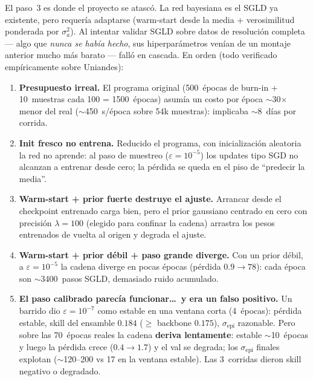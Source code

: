 \documentclass[12pt,a4paper]{article}
\begin{document}
El paso~3 es donde el proyecto se atascó. La red bayesiana es el SGLD ya
existente, pero requería adaptarse (warm-start desde la media +
verosimilitud ponderada por $\sigma_a^2$). Al intentar validar SGLD sobre
datos de resolución completa --- algo que \emph{nunca se había hecho}, sus
hiperparámetros venían de un montaje anterior mucho más barato --- falló en
cascada. En orden (todo verificado empíricamente sobre Uniandes):

\begin{enumerate}[leftmargin=1.6em, noitemsep]
  \item \textbf{Presupuesto irreal.} El programa original (500~épocas de
        burn-in + 10~muestras cada 100 = 1500~épocas) asumía un costo por
        época $\sim$30$\times$ menor del real ($\sim$450~s/época sobre 54k
        muestras): implicaba $\sim$8~días por corrida.
  \item \textbf{Init fresco no entrena.} Reducido el programa, con
        inicialización aleatoria la red no aprende: al paso de muestreo
        ($\varepsilon = 10^{-5}$) los updates tipo SGD no alcanzan a entrenar
        desde cero; la pérdida se queda en el piso de ``predecir la media''.
  \item \textbf{Warm-start + prior fuerte destruye el ajuste.} Arrancar desde
        el checkpoint entrenado carga bien, pero el prior gaussiano centrado
        en cero con precisión $\lambda=100$ (elegido para confinar la cadena)
        arrastra los pesos entrenados de vuelta al origen y degrada el
        ajuste.
  \item \textbf{Warm-start + prior débil + paso grande diverge.} Con un prior
        débil, a $\varepsilon = 10^{-5}$ la cadena diverge en pocas épocas
        (pérdida $0.9\to78$): cada época son $\sim$3400~pasos SGLD, demasiado
        ruido acumulado.
  \item \textbf{El paso calibrado parecía funcionar\ldots\ y era un falso
        positivo.} Un barrido dio $\varepsilon = 10^{-7}$ como estable en una
        ventana corta (4~épocas): pérdida estable, skill del ensamble
        $0.184$ ($\geq$ backbone $0.175$), $\sigma_\text{epi}$ razonable.
        Pero sobre las 70~épocas reales la cadena \textbf{deriva lentamente}:
        estable $\sim$10~épocas y luego la pérdida crece ($0.4\to1.7$) y el
        val se degrada; los $\sigma_\text{epi}$ finales explotan
        ($\sim$120--200 vs 17 en la ventana estable). Las 3~corridas dieron
        skill negativo o degradado.
\end{enumerate}
\end{document}
